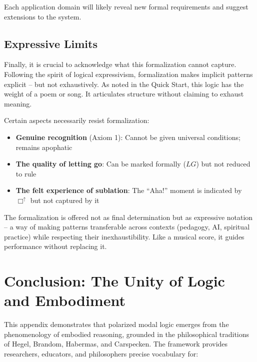 \documentclass[12pt]{book}
\begin{document}
Each application domain will likely reveal new formal requirements and suggest extensions to the system.

\subsection{Expressive Limits}

Finally, it is crucial to acknowledge what this formalization cannot capture. Following the spirit of logical expressivism, formalization makes implicit patterns explicit -- but not exhaustively. As noted in the Quick Start, this logic has the weight of a poem or song. It articulates structure without claiming to exhaust meaning.

Certain aspects necessarily resist formalization:
\begin{itemize}
\item \textbf{Genuine recognition} (Axiom 1): Cannot be given universal conditions; remains apophatic
\item \textbf{The quality of letting go}: Can be marked formally ($LG$) but not reduced to rule
\item \textbf{The felt experience of sublation}: The ``Aha!'' moment is indicated by $\Box^{\uparrow}$ but not captured by it
\end{itemize}

The formalization is offered not as final determination but as expressive notation -- a way of making patterns transferable across contexts (pedagogy, AI, spiritual practice) while respecting their inexhaustibility. Like a musical score, it guides performance without replacing it.

\section{Conclusion: The Unity of Logic and Embodiment}

This appendix demonstrates that polarized modal logic emerges from the phenomenology of embodied reasoning, grounded in the philosophical traditions of Hegel, Brandom, Habermas, and Carspecken. The framework provides researchers, educators, and philosophers precise vocabulary for:
\end{document}

